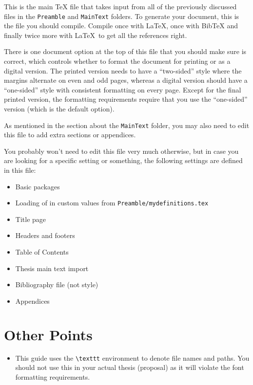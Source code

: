 This is the main TeX file that takes input from all of the previously discussed
files in the \texttt{Preamble} and \texttt{MainText} folders. To generate your
document, this is the file you should compile. Compile once with \LaTeX,
once with BibTeX and finally twice more with \LaTeX\ to get all the references right.

There is one document option at the top of this file that you should make
sure is correct, which controls whether to format the document for printing
or as a digital version. The printed version needs to have a ``two-sided''
style where the margins alternate on even and odd pages, whereas a digital
version should have a ``one-sided'' style with consistent formatting on every
page. Except for the final printed version, the formatting requirements
require that you use the ``one-sided'' version (which is the default option).

As mentioned in the section about the \texttt{MainText} folder, you may also
need to edit this file to add extra sections or appendices.

You probably won't need to edit this file very much otherwise, but in case
you are looking for a specific setting or something, the following settings
are defined in this file:
\begin{itemize}
    \item Basic packages
    \item Loading of in custom values from \texttt{Preamble/mydefinitions.tex}
    \item Title page
    \item Headers and footers
    \item Table of Contents
    \item Thesis main text import
    \item Bibliography file (not style)
    \item Appendices
\end{itemize}

\section{Other Points}

\begin{itemize}
    \item This guide uses the \texttt{\textbackslash texttt} environment to denote file
        names and paths. You should not use this in your actual thesis (proposal)
        as it will violate the font formatting requirements.
\end{itemize}

